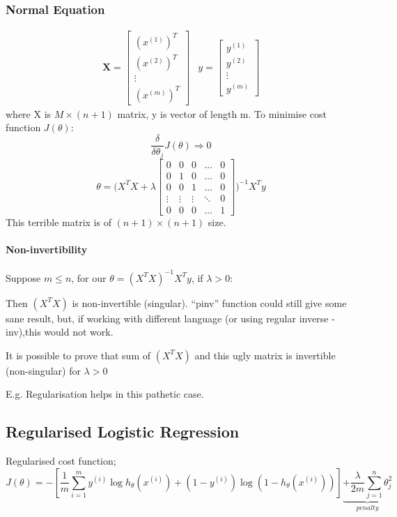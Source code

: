 \documentclass{scrartcl}
\begin{document}
\subsubsection{Normal Equation}
\label{sec:7-2-2}
\begin{equation*}
  \begin{array}{ll}
    \mathbf{X} = \left[ \begin{array}{c} (x^{(1)})^T \\ (x^{(2)})^T \\
        \vdots \\ (x^{(m)})^T \end{array} \right] & y =
    \left[ \begin{array}{c} y^{(1)}  \\ y^{(2)}  \\  \vdots \\ y^{(m)} \end{array} \right]
  \end{array}
\end{equation*}
where X is $M \times (n+1)$ matrix, y is vector of length m. To
minimise cost function $J(\theta)$: \[ \frac{\delta}{\delta
  \theta_j}J(\theta) \Rightarrow 0 \]
\[
\theta = \Big(X^T X + \lambda \left[ \begin{array}{ccccc} 0 & 0 & 0 &
    \dots & 0 \\ 0 & 1 & 0 & \dots & 0 \\ 0 & 0 & 1 & \dots & 0 \\
    \vdots & \vdots & \vdots & \ddots & 0 \\ 0 & 0 & 0 & \dots &
    1 \end{array} \right] \Big)^{-1} X^Ty
\]
This terrible matrix is of $(n+1) \times (n+1)$ size.

\paragraph{Non-invertibility}
Suppose $m \leq n$, for our $\theta = (X^T X)^{-1}X^Ty$, if $\lambda >
0$:

Then $(X^T X)$ is non-invertible (singular). ``pinv'' function could
still give some sane result, but, if working with different language
(or using regular inverse - inv),this would not work.

It is possible to prove that sum of $(X^T X)$ and this ugly matrix is
invertible (non-singular) for $\lambda > 0$

E.g. Regularisation helps in this pathetic case.

\subsection{Regularised Logistic Regression}
\label{sec:7-4}
Regularised cost function; \[ J(\theta) = -\left[ \frac{1}{m} \sum
  \limits_{i=1}^{m} y^{(i)} \log h_\theta(x^{(i)}) + (1 - y^{(i)})
  \log (1 - h_\theta(x^{(i)})) \right] \underbrace{+
  \frac{\lambda}{2m} \sum \limits_{j=1}^{n} \theta_j^2} _{penalty}
\]
\end{document}
